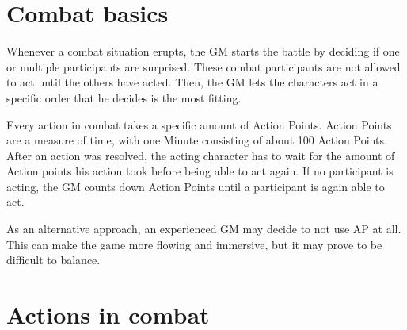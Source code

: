 \section{Combat basics}
Whenever a combat situation erupts, the GM starts the battle by deciding if one or multiple participants are surprised. These combat participants are not allowed to act until the others have acted. Then, the GM lets the characters act in a specific order that he decides is the most fitting.

Every action in combat takes a specific amount of Action Points. Action Points are a measure of time, with one Minute consisting of about 100 Action Points. After an action was resolved, the acting character has to wait for the amount of Action points his action took before being able to act again. If no participant is acting, the GM counts down Action Points until a participant is again able to act.

As an alternative approach, an experienced GM may decide to not use AP at all. This can make the game more flowing and immersive, but it may prove to be difficult to balance.



\section{Actions in combat}

